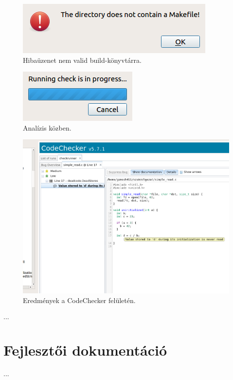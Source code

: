 \documentclass[a4paper,12pt]{report}
\begin{document}
\begin{figure}[h]
\caption{Hibaüzenet nem valid build-könyvtárra.}
\centering
\includegraphics[scale=0.8]{build_dir_error.png}
\end{figure}

\begin{figure}[h]
\caption{Analízis közben.}
\centering
\includegraphics[scale=0.8]{progress_bar.png}
\end{figure}

\begin{figure}[h]
\caption{Eredmények a CodeChecker felületén.}
\centering
\includegraphics[scale=0.4]{ui_results_open.png}
\end{figure}

...


\chapter{Fejlesztői dokumentáció}

...
\end{document}
